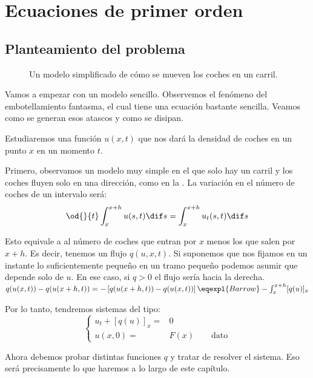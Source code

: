 \chapter{Ecuaciones de primer orden}

	\section{Planteamiento del problema}
	\label{sec:PlanteamientoPrimerOrden}

	\begin{figure}[thbp]
	\centering
	\caption{Un modelo simplificado de cómo se mueven los coches en un carril.}
	\label{fig:CochesCarril}
	\end{figure}

	Vamos a empezar con un modelo sencillo. Observemos el fenómeno del embotellamiento fantasma, el cual tiene una ecuación bastante sencilla. Veamos como se generan esos atascos y como se disipan.

	Estudiaremos una función $u(x,t)$ que nos dará la densidad de coches en un punto $x$ en un momento $t$.

	Primero, observamos un modelo muy simple en el que solo hay un carril y los coches fluyen solo en una dirección, como en la . La variación en el número de coches de un intervalo será:
	\[ \od{}{t} \int^{x+h}_{x} u(s,t) \dif s = \int^{x+h}_{x} u_t(s,t) \dif s \]

	Esto equivale a al número de coches que entran por $x$ menos los que salen por $x + h$. Es decir, tenemos un flujo $q(u, x, t)$. Si suponemos que nos fijamos en un instante lo suficientemente pequeño en un tramo pequeño podemos asumir que depende solo de $u$. En ese caso, si $q > 0$ el flujo sería hacia la derecha.
	\( q(u(x,t)) - q(u(x+h,t)) = -\left[ q(u(x+h,t)) -  q(u(x,t)) \right] \eqexpl{Barrow} -\int^{x+h}_{x} [q(u)]_{x}
	\label{eq:BaseFlujo}\)

	Por lo tanto, tendremos sistemas del tipo:
	\begin{equation}
	\left\{
	\begin{array}{rl}
	u_t + [q(u)]_{x} =&\!\!\! 0 \\
	u(x, 0) =&\!\!\! F(x) \quad \quad \text{dato}
	\end{array}
	\right. \label{eq:ModeloAtasco}
	\end{equation}

	Ahora debemos probar distintas funciones $q$ y tratar de resolver el sistema. Eso será precisamente lo que haremos a lo largo de este capítulo.

